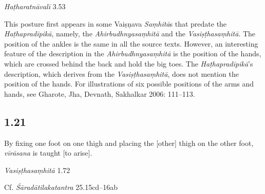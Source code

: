 \begin{ekdosis}
\begin{testimonia}[hp01_020]
\emph{Haṭharatnāvalī} 3.53

\begin{versinnote}
\end{versinnote}

\end{testimonia}

\begin{philcomm}[hp01_020]        
This posture first appears in some Vaiṣṇava \emph{Saṃhitā}s that predate the \emph{Haṭhapradīpikā}, namely, the \emph{Ahirbudhnyasaṃhitā} and the \emph{Vasiṣṭhasaṃhitā}. The position of the ankles is the same in all the source texts. However, an interesting feature of the description in the \emph{Ahirbudhnyasaṃhitā} is the position of the hands, which are crossed behind the back and hold the big toes. The \emph{Haṭhapradīpikā}’s description, which derives from the \emph{Vasiṣṭhasaṃhitā}, does not mention the position of the hands. For illustrations of six possible positions of the arms and hands, see Gharote, Jha, Devnath, Sakhalkar 2006: 111–113.
\end{philcomm}

\subsection*{1.21}
\begin{translation}[hp01_021]
By fixing one foot on one thigh and placing the [other] thigh on the other foot, \emph{vīrāsana} is taught [to arise].
\end{translation}

\begin{sources}[hp01_021]
\emph{Vasiṣṭhasaṃhitā} 1.72

\begin{versinnote}
\end{versinnote}

Cf. \emph{Śāradātilakatantra} 25.15cd–16ab

\begin{versinnote}
\end{versinnote}


\end{sources}
\end{ekdosis}
